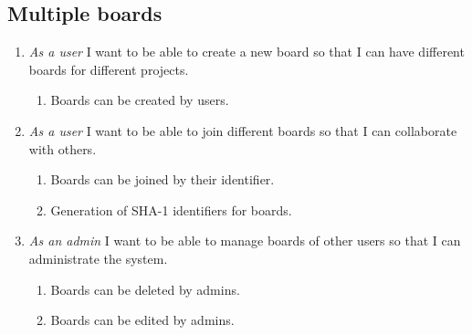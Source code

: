 \documentclass{article}
\begin{document}
	\subsection{Multiple boards}
	\begin{enumerate}
		\item \emph{As a user} I want to be able to create a new board so that I can have different boards for different projects.
			\begin{enumerate}
				\item Boards can be created by users.
			\end{enumerate}
		\item \emph{As a user} I want to be able to join different boards so that I can collaborate with others.
			\begin{enumerate}
				\item Boards can be joined by their identifier.
				\item Generation of SHA-1 identifiers for boards.
			\end{enumerate}

		\begin{center}
		\end{center}
		\item \emph{As an admin} I want to be able to manage boards of other users so that I can administrate the system.
			\begin{enumerate}
				\item Boards can be deleted by admins.
				\item Boards can be edited by admins.
			\end{enumerate}
	\end{enumerate}
\end{document}

